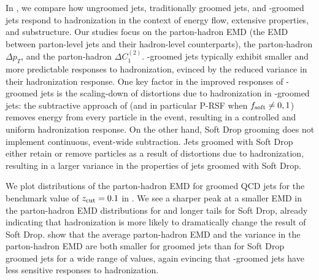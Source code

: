 In , we compare how ungroomed jets, traditionally groomed jets, and \PIRANHA{}-groomed jets respond to \gls{hadronization} in the context of energy flow, extensive properties, and substructure.
%
Our studies focus on the parton-hadron EMD (the EMD between parton-level jets and their hadron-level counterparts), the parton-hadron \(\Delta p_T\), and the parton-hadron \(\Delta C_1^{(2)}\).
%
\PIRANHA{}-groomed jets typically exhibit smaller and more predictable responses to \gls{hadronization}, evinced by the reduced variance in their \gls{hadronization} response.
%
One key factor in the improved responses of \PIRANHA{}-groomed jets is the scaling-down of distortions due to \gls{hadronization} in \PIRANHA{}-groomed jets:
%
the subtractive approach of \PIRANHA{} (and in particular P-RSF when \(f_{\rm soft} \neq 0, 1\)) removes energy from every particle in the event, resulting in a controlled and uniform \gls{hadronization} response.
%
On the other hand, Soft Drop grooming does not implement continuous, event-wide subtraction.
%
Jets groomed with Soft Drop either retain or remove particles as a result of distortions due to \gls{hadronization}, resulting in a larger variance in the properties of jets groomed with Soft Drop.

We plot distributions of the parton-hadron EMD for groomed QCD jets for the benchmark value of $z_{\rm cut}{}=0.1$ in .
%
We see a sharper peak at a smaller EMD in the parton-hadron EMD distributions for  and longer tails for Soft Drop, already indicating that \gls{hadronization} is more likely to dramatically change the result of Soft Drop.
%
 show that the average parton-hadron EMD and the variance in the parton-hadron EMD are both smaller for  groomed jets than for Soft Drop groomed jets for a wide range of \zcut{} values, again evincing that \PIRANHA{}-groomed jets have less sensitive responses to \gls{hadronization}.


